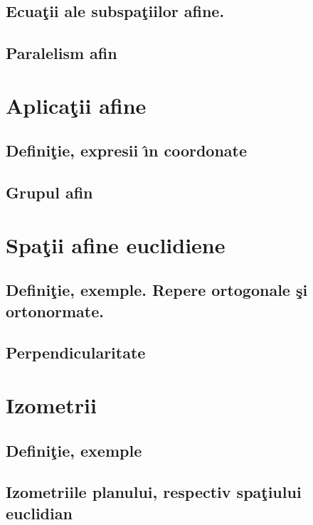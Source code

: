 \documentclass[12pt]{book}
\begin{document}
\subsection{Ecua\c tii ale subspa\c tiilor afine.}
\subsection{Paralelism afin}













\section{Aplica\c tii afine}
\subsection{Defini\c tie, expresii \^{\i}n coordonate}
\subsection{Grupul afin}

\section{Spa\c tii afine euclidiene}

\subsection{Defini\c tie, exemple. Repere ortogonale \c si ortonormate.}
\subsection{Perpendicularitate}

\section{Izometrii}
\subsection{Defini\c tie, exemple}
\subsection{Izometriile planului, respectiv spa\c tiului euclidian}
\end{document}
